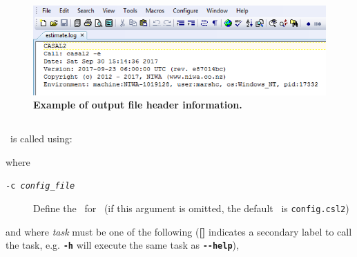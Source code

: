 \begin{figure}[htp]
	\includegraphics[scale=1]{Figures/eglog.png}
	\caption{\textbf{Example of output file header information.}}\label{fig:log_file_1}
\end{figure}

\vspace*{4mm}

\subsection{\label{sec:command-line-arguments}}

\CNAME\ is called using:

\texttt{}

where

\begin{description}
  \item [\texttt{-c \emph{config\_file}}] Define the \config~for \CNAME\ (if this argument is omitted, the default \config\ is \texttt{config.csl2})
\end{description}

and where \emph{task} must be one of the following (\textbf{[]} indicates a secondary label to call the task, e.g. \textbf{\texttt{-h}} will execute the same task as \textbf{\texttt{-{}-help}}),

